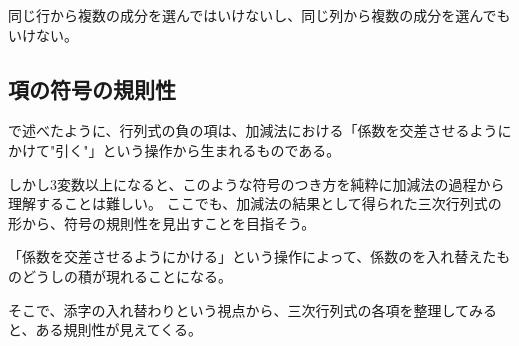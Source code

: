 \documentclass[../../../topic_linear-algebra]{subfiles}
\begin{document}
同じ行から複数の成分を選んではいけないし、同じ列から複数の成分を選んでもいけない。

\subsection{項の符号の規則性}

で述べたように、行列式の負の項は、加減法における「係数を交差させるようにかけて"引く"」という操作から生まれるものである。

\br

しかし3変数以上になると、このような符号のつき方を純粋に加減法の過程から理解することは難しい。
ここでも、加減法の結果として得られた三次行列式の形から、符号の規則性を見出すことを目指そう。

\br

「係数を交差させるようにかける」という操作によって、係数のを入れ替えたものどうしの積が現れることになる。

そこで、添字の入れ替わりという視点から、三次行列式の各項を整理してみると、ある規則性が見えてくる。
\end{document}
